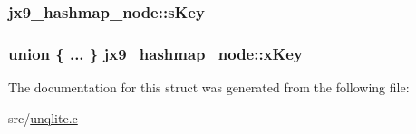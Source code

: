\hypertarget{structjx9__hashmap__node_a916a33768b366af53f0a3471017f54fa}{
\subsubsection[{s\-Key}]{ jx9\-\_\-hashmap\-\_\-node\-::s\-Key}}\label{dc/daf/structjx9__hashmap__node_a916a33768b366af53f0a3471017f54fa}
\hypertarget{structjx9__hashmap__node_acb889087bd830fb7096a77eaa94a0af4}{
\subsubsection[{x\-Key}]{\setlength{\rightskip}{0pt plus 5cm}union \{ ... \}  jx9\-\_\-hashmap\-\_\-node\-::x\-Key}}\label{dc/daf/structjx9__hashmap__node_acb889087bd830fb7096a77eaa94a0af4}


The documentation for this struct was generated from the following file\-:\begin{DoxyCompactItemize}
\item 
src/\hyperlink{unqlite_8c}{unqlite.\-c}\end{DoxyCompactItemize}
